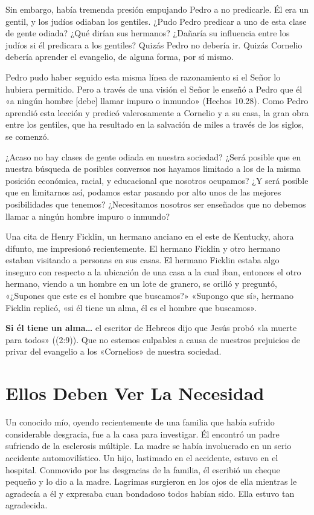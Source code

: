 \documentclass[12pt, twoside, openright]{book}
\begin{document}
Sin embargo, había tremenda presión empujando Pedro a no predicarle. Él era un gentil, y los judíos odiaban los gentiles. ¿Pudo Pedro predicar a uno de esta clase de gente odiada? ¿Qué dirían sus hermanos? ¿Dañaría su influencia entre los judíos si él predicara a los gentiles? Quizás Pedro no debería ir. Quizás Cornelio debería aprender el evangelio, de alguna forma, por sí mismo.

Pedro pudo haber seguido esta misma línea de razonamiento si el Señor lo hubiera permitido. Pero a través de una visión el Señor le enseñó a Pedro que él «a ningún hombre [debe] llamar impuro o inmundo» (Hechos 10.28). Como Pedro aprendió esta lección y predicó valerosamente a Cornelio y a su casa, la gran obra entre los gentiles, que ha resultado en la salvación de miles a través de los siglos, se comenzó.

¿Acaso no hay clases de gente odiada en nuestra sociedad? ¿Será posible que en nuestra búsqueda de posibles conversos nos hayamos limitado a los de la misma posición económica, racial, y educacional que nosotros ocupamos?  ¿Y será posible que en limitarnos así, podamos estar pasando por alto unos de las mejores posibilidades que tenemos? ¿Necesitamos nosotros ser enseñados que no debemos llamar a ningún hombre impuro o inmundo?

Una cita de Henry Ficklin, un hermano anciano en el este de Kentucky, ahora difunto, me impresionó recientemente. El hermano Ficklin y otro hermano estaban visitando a personas en sus casas. El hermano Ficklin estaba algo inseguro con respecto a la ubicación de una casa a la cual iban, entonces el otro hermano, viendo a un hombre en un lote de granero, se orilló y preguntó, «¿Supones que este es el hombre que buscamos?» «Supongo que sí», hermano Ficklin replicó, «si él tiene un alma, él es el hombre que buscamos».

\textbf{Si él tiene un alma\ldots} el escritor de Hebreos dijo que Jesús probó «la muerte para todos» ((2:9)). Que no estemos culpables a causa de nuestros prejuicios de privar del evangelio a los «Cornelios» de nuestra sociedad.

\section{Ellos Deben Ver La Necesidad}
Un conocido mío, oyendo recientemente de una familia que había sufrido considerable desgracia, fue a la casa para investigar. Él encontró un padre sufriendo de la esclerosis múltiple. La madre se había involucrado en un serio accidente automovilístico. Un hijo, lastimado en el accidente, estuvo en el hospital. Conmovido por las desgracias de la familia, él escribió un cheque pequeño y lo dio a la madre. Lagrimas surgieron en los ojos de ella mientras le agradecía a él y expresaba cuan bondadoso todos habían sido. Ella estuvo tan agradecida. 
\end{document}
